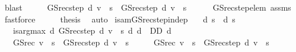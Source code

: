 \begin{isabellebody}
\ blast\isanewline
\ \ \isamarkupfalse%
\ \isamarkupfalse%
\ {\isachardoublequoteopen}GS{\isacharunderscore}{\kern0pt}rec{\isacharunderscore}{\kern0pt}step\ d\ v\ {\isachardollar}{\kern0pt}\ s\ {\isacharequal}{\kern0pt}\ GS{\isacharunderscore}{\kern0pt}rec{\isacharunderscore}{\kern0pt}step\ d{\isacharprime}{\kern0pt}\ v\ {\isachardollar}{\kern0pt}\ s{\isachardoublequoteclose}\isanewline
\ \ \ \ \isamarkupfalse%
\ GS{\isacharunderscore}{\kern0pt}rec{\isacharunderscore}{\kern0pt}step{\isacharunderscore}{\kern0pt}elem\ assms{\isacharparenleft}{\kern0pt}{}{\isacharparenright}{\kern0pt}\ \isamarkupfalse%
\ fastforce\isanewline
\ \ \isamarkupfalse%
\ \isamarkupfalse%
\ {\isacharquery}{\kern0pt}thesis\ \isamarkupfalse%
\ auto\isanewline
{}\isamarkupfalse%
%
\endisatagproof
{\isafoldproof}%
%
\isadelimproof
\isanewline
%
\endisadelimproof
\isanewline
{}\isamarkupfalse%
\ is{\isacharunderscore}{\kern0pt}am{\isacharunderscore}{\kern0pt}GS{\isacharunderscore}{\kern0pt}rec{\isacharunderscore}{\kern0pt}step{\isacharunderscore}{\kern0pt}indep{\isacharprime}{\kern0pt}{\isacharcolon}{\kern0pt}\isanewline
\ \ \ {\isachardoublequoteopen}d\ s\ {\isacharequal}{\kern0pt}\ d{\isacharprime}{\kern0pt}\ s{\isachardoublequoteclose}\isanewline
\ \ \ {\isachardoublequoteopen}is{\isacharunderscore}{\kern0pt}arg{\isacharunderscore}{\kern0pt}max\ {\isacharparenleft}{\kern0pt}{\isasymlambda}d{\isachardot}{\kern0pt}\ GS{\isacharunderscore}{\kern0pt}rec{\isacharunderscore}{\kern0pt}step\ d\ v\ {\isachardollar}{\kern0pt}\ s{\isacharparenright}{\kern0pt}\ {\isacharparenleft}{\kern0pt}{\isasymlambda}d{\isachardot}{\kern0pt}\ d\ {\isasymin}\ D\isactrlsub D{\isacharparenright}{\kern0pt}\ d{\isachardoublequoteclose}\isanewline
\ \ \ {\isachardoublequoteopen}GS{\isacharunderscore}{\kern0pt}rec\ v\ {\isachardollar}{\kern0pt}\ s\ {\isacharequal}{\kern0pt}\ GS{\isacharunderscore}{\kern0pt}rec{\isacharunderscore}{\kern0pt}step\ d{\isacharprime}{\kern0pt}\ v\ {\isachardollar}{\kern0pt}\ s{\isachardoublequoteclose}\isanewline
%
\isadelimproof
%
\endisadelimproof
%
\isatagproof
{}\isamarkupfalse%
\ {\isacharminus}{\kern0pt}\isanewline
\ \ \isamarkupfalse%
\ {\isachardoublequoteopen}GS{\isacharunderscore}{\kern0pt}rec\ v\ {\isachardollar}{\kern0pt}\ s\ {\isacharequal}{\kern0pt}\ GS{\isacharunderscore}{\kern0pt}rec{\isacharunderscore}{\kern0pt}step\ d\ v\ {\isachardollar}{\kern0pt}\ s{\isachardoublequoteclose}\isanewline

\end{isabellebody}
